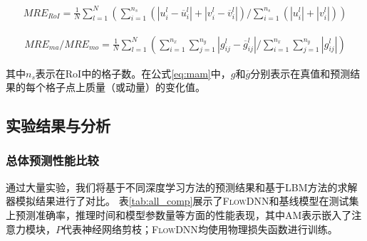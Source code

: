 \begin{align}
MRE_{RoI} = { \frac{1}{N} \sum\limits_{l = 1}^N \left( { {\sum\limits_{i = 1}^{{n_s}} {\left( {\left|
					{u_{i}^l - \overline u _{i}^l} \right| + \left| {v_{i}^l - \overline v _{i}^l} \right|} \right)} } } /  {{ {\sum\limits_{i = 1}^{{n_s}}
				{\left( {\left| {u _{i}^l} \right| + \left| { v _{i}^l} \right|} \right)} } }} \right)}
\end{align}

\begin{align}
MRE_{ma} / MRE_{mo} = { \frac{1}{N} \sum\limits_{l = 1}^N  \left({\sum\limits_{i = 1}^{{n_x}} {\sum\limits_{j = 1}^{{n_y}} { {\left| {g_{ij}^l - \overline g _{ij}^l} \right| } } } } /  {{\sum\limits_{i =1}^{{n_x}} {\sum\limits_{j = 1}^{{n_y}} { {\left| {g _{ij}^l} \right|} } } }} \right)} 
\label{eq:mam}
\end{align}

\noindent 其中$n_s$表示在RoI中的格子数。在公式\ref{eq:mam}中，$g$和$\overline g$分别表示在真值和预测结果的每个格子点上质量（或动量）的变化值。



\subsection{实验结果与分析}

\subsubsection{总体预测性能比较}
通过大量实验，我们将基于不同深度学习方法的预测结果和基于LBM方法的求解器模拟结果进行了对比。
表\ref{tab:all_comp}展示了\textsc{FlowDNN}和基线模型在测试集上预测准确率，推理时间和模型参数量等方面的性能表现，其中AM表示嵌入了注意力模块，$P$代表神经网络剪枝；\textsc{FlowDNN}均使用物理损失函数进行训练。

